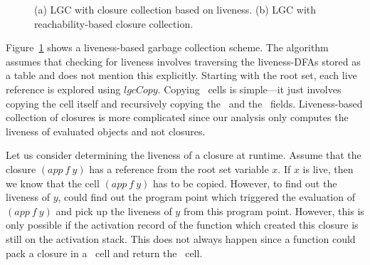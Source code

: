 \documentclass[9pt]{sigplanconf}
\begin{document}
\begin{figure}[t!]
\label{fig:algos}
\hfill
{}
\hfill
{}
\hfill
\caption{(a) LGC with closure collection based on liveness.  (b)
  LGC with reachability-based closure collection.}
    
\end{figure}
 
  
Figure~\ref{fig:algos}  shows   a  liveness-based  garbage  collection
scheme.   The algorithm  assumes that  checking for  liveness involves
traversing the  liveness-DFAs stored as  a table and does  not mention
this explicitly.  Starting  with the root set, each  live reference is
explored   using  $\mathit{  lgcCopy}$.    Copying  \CONS\   cells  is
simple---it  just involves  copying  the cell  itself and  recursively
copying the \CAR\ and  the \CDR\ fields.  Liveness-based collection of
closures  is more  complicated since  our analysis  only  computes the
liveness of evaluated objects and not closures.

Let   us  consider   determining  the   liveness  of   a   closure  at
runtime. Assume  that the closure  $(app~f~y)$ has a  reference from
the root  set variable $x$. If $x$  is live,  then we  know that the
cell $(app~f~y)$ has  to be copied. However, to find out  the
liveness of $y$, could find out the program point which triggered the
evaluation of $(app~f~y)$ and pick up the liveness of $y$ from this
program point. However, this is only possible if the activation record
of the function which created this closure is still on the activation
stack. This does not always happen since a function could pack a
closure in a \CONS\ cell and return the \CONS\ cell.
\end{document}
